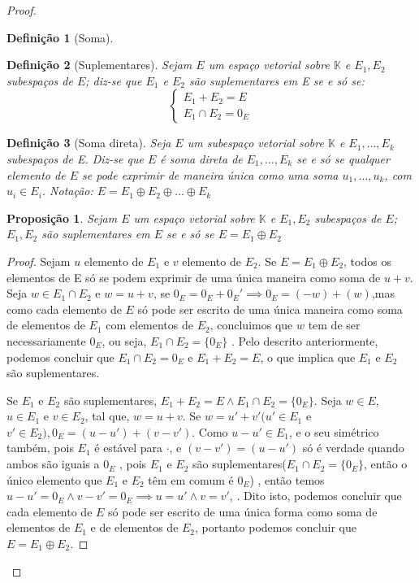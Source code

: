 \documentclass{article}
\newtheorem{proposition}{Proposição}[section]
\newtheorem{definition}{Definição}[section]
\begin{document}
\begin{proof}
\begin{definition}[Soma]
	\end{definition}
	\begin{definition}[Suplementares]
		Sejam $E$ um espaço vetorial sobre $\mathbb{K}$ e $E_1,E_2$ subespaços de $E$; diz-se que $E_1 $ e $E_2$ são suplementares em E se e só se:
		\begin{equation}
			\begin{cases}
 			 	E_1 + E_2 = E \\
  				E_1 \cap E_2 = {0_E}
			\end{cases}
		\end{equation}
	\end{definition}
	\begin{definition}[Soma direta]

		Seja $E$ um subespaço vetorial sobre $\mathbb{K}$ e $E_1,\dots,E_k $ subespaços de E. Diz-se que $E$ é soma direta de $E_1,\dots,E_k $ se e só se qualquer elemento de $E$ se pode exprimir de maneira única como uma soma $u_1,\dots,u_k$, com $u_i \in E_i$.
Notação: $E=E_1\oplus E_2\oplus \dots \oplus E_k$

	\end{definition}

	\begin{proposition}
		Sejam $E$ um espaço vetorial sobre $\mathbb{K}$ e $E_1,E_2 $ subespaços de $E$; $E_1,E_2$ são suplementares em $E$ se e só se $E=E_1 \oplus E_2$
	\end{proposition}
	
	\begin{proof}
		Sejam $u$ elemento de $E_1$ e $v$ elemento de $E_2$.
		Se $E=E_1\oplus E_2$, todos os elementos de E só se podem exprimir de uma única maneira como soma de $u + v$. Seja $w\in E_1\cap E_2$ e $w=u+v$, se $0_E=0_E+0_E' \implies 0_E=(-w)+(w)$,mas como cada elemento de $E$ só pode ser escrito de uma única maneira como soma de elementos de $E_1$ com elementos de $E_2$, concluimos que $w$ tem de ser necessariamente $0_E$, ou seja,  $E_1\cap E_2=\{0_E\}$ .  
		Pelo descrito anteriormente, podemos concluir que $E_1\cap E_2=0_E$ e $E_1+E_2=E$, o que implica que $E_1$ e $E_2$ são suplementares.

		Se $E_1$ e $E_2$ são suplementares, $E_1 + E_2 =E\land E_1\cap E_2=\{0_E\}$. Seja $w \in E$, $u \in E_1$ e $v\in E_2$, tal que, $w=u+v$. Se $w=u'+v'(u'\in E_1$ e $v'\in E_2), 0_E=(u-u')+(v-v')$. Como $u-u'\in E_1$, e o seu simétrico também, pois $E_1$ é estável para $\cdot$, e $(v-v')=(u-u')$ só é verdade quando ambos são iguais a $0_E$ , pois  $E_1$ e $E_2$ são suplementares($E_1\cap E_2=\{0_E\}$, então o único elemento que $E_1$ e $E_2$ têm em comum é $0_E$) , então temos $ u-u'=0_E\land v-v'=0_E\implies u=u'\land v=v'$, . Dito isto, podemos concluir que cada elemento de $E$ só pode ser escrito de uma única forma como soma de elementos de $E_1$ e de elementos de $E_2$, portanto podemos concluir que $E=E_1\oplus E_2$.
	\end{proof}
		

\end{proof}
\end{document}
